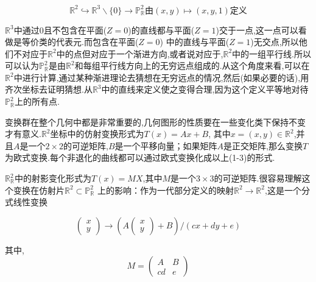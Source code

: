 \documentclass[UTF8]{book}
\begin{document}
		\vspace{-9mm}
		\begin{equation*}
		\mathbb{R}^{2} \hookrightarrow \mathbb{R}^{3} \backslash\{0\} \rightarrow \mathbb{P}^{2}_{\mathbb{R}} \text{由}(x, y) \mapsto(x, y, 1) \text{定义}
		\end{equation*}
		\vspace{5mm}
	
		$\mathbb{R}^{3}$中通过$ 0 $且不包含在平面($ Z=0 $)的直线都与平面($ Z=1 $)交于一点,这一点可以看做是等价类的代表元.而包含在平面($ Z=0 $) 中的直线与平面($ Z=1 $)无交点,所以他们不对应于$\mathbb{R}^{2}$中的点但对应于一个渐进方向,或者说对应于,$\mathbb{R}^{2}$中的一组平行线.所以可以认为$\mathbb{P}^{2}_{	\mathbb{R}}$是由$\mathbb{R}^{2}$和每组平行线方向上的无穷远点组成的.从这个角度来看,可以在$\mathbb{R}^{2}$中进行计算,通过某种渐进理论去猜想在无穷远点的情况,然后(如果必要的话),用齐次坐标去证明猜想.从$\mathbb{R}^{3}$中的直线来定义使之变得合理,因为这个定义平等地对待$\mathbb{P}^{2}_{\mathbb{R}}$上的所有点.
		
		
		变换群在整个几何中都是非常重要的,几何图形的性质要在一些变化类下保持不变才有意义.$\mathbb{R}^{2}$坐标中的仿射变换形式为$ T(x)=Ax+B $, 其中$x=(x,y)\in \mathbb{R}^{2}$,并且$ A $是一个$2\times2$的可逆矩阵,$ B $是一个平移向量；如果矩阵$ A $是正交矩阵,那么变换$ T $为欧式变换.每个非退化的曲线都可以通过欧式变换化成以上(1-3)的形式.
		
		
		$\mathbb{R}^{2}_{\mathbb{R}}$中的射影变化形式为$ T(x)=MX $,其中$ M $是一个$3\times3$的可逆矩阵.很容易理解这个变换在仿射片$\mathbb{R}^{2} \subset \mathbb{P}^{2}_{\mathbb{R}}$ 上的影响：作为一代部分定义的映射$\mathbb{R}^{2}\rightarrow \mathbb{R}^{2}$,这是一个分式线性变换
		
		\begin{equation*}
		\begin{pmatrix} x \\ y  \end{pmatrix}
		\rightarrow (A\begin{pmatrix} x \\ y\end{pmatrix}+B)/(cx+dy+e)
		\end{equation*}
	
		其中,
		\begin{equation*}
		M=\begin{pmatrix} A  & B \\ c  d &e\end{pmatrix}
		\end{equation*}
	
\end{document}
